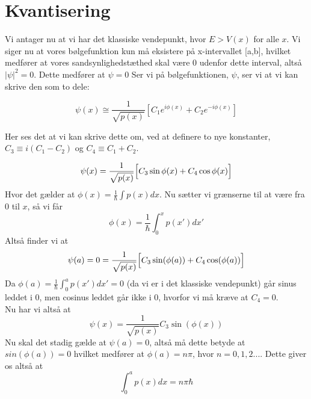 \section{Kvantisering}
Vi antager nu at vi har det klassiske vendepunkt, hvor $E > V(x) $ for alle $ x$. Vi siger nu at vores bølgefunktion kun må eksistere på x-intervallet [a,b], hvilket medfører at vores sandsynlighedstæthed skal være 0 udenfor dette interval, altså $|\psi|^2 = 0$. Dette medfører at $\psi = 0$
Ser vi på bølgefunktionen, $\psi$, ser vi at vi kan skrive den som to dele:

\begin{equation}
  \psi(x) \cong \frac{1}{\sqrt{p(x)}}\left[C_1e^{i\phi(x)}+C_2e^{-i\phi(x)}\right]
  \label{eq:kvantiseringStart}
\end{equation}

Her ses det at vi kan skrive dette om, ved at definere to nye konstanter, $C_3 \equiv i(C_1-C_2)$ og $C_4 \equiv C_1+C_2$.

\begin{equation}
  \psi(x) = \frac{1}{\sqrt{p(x)}}
  \Bigl[    C_3\sin{\phi(x)}+C_4\cos{\phi(x)}   \Bigr]
  \label{eq:kvantiseringSinCos}
\end{equation}
Hvor det gælder at $\phi(x) = \frac{1}{\hbar}\int p(x) dx$. Nu sætter vi grænserne til at være fra $0$ til $x$, så vi får
\begin{equation}
  \phi(x) = \frac{1}{\hbar}\int_{0}^{x} p(x')dx'
\end{equation}
Altså finder vi at
\begin{equation}
  \psi(a) = 0 = \frac{1}{\sqrt{p(x)}}\Bigl[C_3\sin(\phi(a)) + C_4\cos(\phi(a))     \Bigr]
  \label{eq:kvantiseringGraense}
\end{equation}
Da $\phi(a) = \frac{1}{\hbar}\int_{0}^{a} p(x') dx' = 0$ (da vi er i det klassiske vendepunkt) går sinus leddet i 0, men cosinus leddet går ikke i 0, hvorfor vi må kræve at $C_4 = 0$.\\
Nu har vi altså at
\begin{equation}
  \psi(x) = \frac{1}{\sqrt{p(x)}}C_3\sin(\phi(x))
\end{equation}
Nu skal det stadig gælde at $\psi(a) = 0$, altså må dette betyde at $sin(\phi(a)) = 0$ hvilket medfører at $\phi(a) = n\pi$, hvor $n = 0,1,2...$.
Dette giver os altså at
\begin{equation}
  \int_{0}^{a} p(x) dx = n\pi\hbar
\end{equation}
